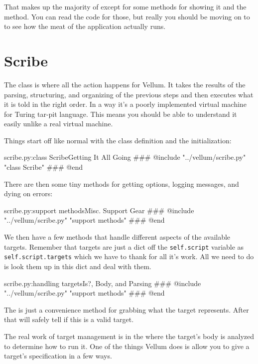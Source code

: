 That makes up the majority of  except for some methods for 
showing it and the  method.  You can read the code for those,
but really you should be moving on to  to see how the
meat of the application actually runs.



\section{Scribe}

The  class is where all the action happens for Vellum.  It takes
the results of the parsing, structuring, and organizing of the previous steps
and then executes what it is told in the right order.  In a way it's a poorly
implemented virtual machine for Turing tar-pit language.  This means you should
be able to understand it easily unlike a real virtual machine.

Things start off like normal with the class definition and the initialization:

\begin{code}{scribe.py:class Scribe}{Getting It All Going}
### @include "../vellum/scribe.py" "class Scribe"
### @end
\end{code}

There are then some tiny methods for getting options, logging messages, and
dying on errors:

\begin{code}{scribe.py:support methods}{Misc. Support Gear}
### @include "../vellum/scribe.py" "support methods"
### @end
\end{code}

We then have a few methods that handle different aspects of the available
targets.  Remember that targets are just a dict off the \verb|self.script|
variable as \verb|self.script.targets| which we have  to thank for
all it's work.  All we need to do is look them up in this dict and deal with
them.

\begin{code}{scribe.py:handling targets}{Is?, Body, and Parsing}
### @include "../vellum/scribe.py" "support methods"
### @end
\end{code}

The  is just a convenience method for grabbing what the
target represents.  After that  will safely tell 
if this is a valid target.

The real work of target management is in the  where the
target's body is analyzed to determine how to run it.   One of the things Vellum
does is allow you to give a target's specification in a few ways.

